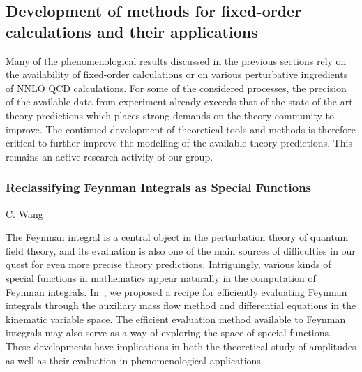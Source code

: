 \documentclass{FBR_Bericht_2025}
\begin{document}
\subsection{Development of methods for fixed-order calculations and their applications}
\begin{refsection}

Many of the phenomenological results discussed in the previous sections rely on the availability of fixed-order calculations or on various perturbative ingredients of NNLO QCD calculations.
%
For some of the considered processes, the precision of the available data from experiment already exceeds that of the state-of-the art theory predictions which places strong demands on the theory community to improve.
%
The continued development of theoretical tools and methods is therefore critical to further improve the modelling of the available theory predictions. This remains an active research activity of our group. %

\subsubsection{Reclassifying Feynman Integrals as Special Functions}
\begin{Namen}
C. Wang
\end{Namen}
%
The Feynman integral is a central object in the perturbation theory of quantum field theory, and its evaluation is also one of the main sources of difficulties in our quest for even more precise theory predictions.
Intriguingly, various kinds of special functions in mathematics appear naturally in the computation of Feynman integrals.
In~\cite{Liu:2023jkr}, we proposed a recipe for efficiently evaluating Feynman integrals through the auxiliary mass flow method and differential equations in the kinematic variable space.
The efficient evaluation method available to Feynman integrals may also serve as a way of exploring the space of special functions.
These developments have implications in both the theoretical study of amplitudes as well as their evaluation in phenomenological applications.


\end{refsection}
\end{document}
